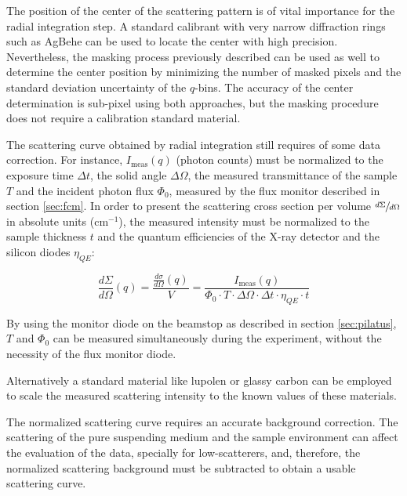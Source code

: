 The position of the center of the scattering pattern is of vital importance for the radial integration step. A standard calibrant with very narrow diffraction rings such as AgBehe can be used to locate the center with high precision. Nevertheless, the masking process previously described can be used as well to determine the center position by minimizing the number of masked pixels and the standard deviation uncertainty of the $q$-bins. The accuracy of the center determination is sub-pixel using both approaches, but the masking procedure does not require a calibration standard material.

The scattering curve obtained by radial integration still requires of some data correction. For instance, $I_{\text{meas}}(q)$ (photon counts) must be normalized to the exposure time $\Delta t$, the solid angle $\Delta \Omega$, the measured transmittance of the sample $T$ and the incident photon flux $\Phi_0$, measured by the flux monitor described in section \ref{sec:fcm}. In order to present the scattering cross section per volume $\sfrac{d\Sigma}{d\Omega}$ in absolute units (cm$^{-1}$), the measured intensity must be normalized to the sample thickness $t$ and the quantum efficiencies of the X-ray detector and the silicon diodes $\eta_{QE}$: 

\begin{equation}
\frac{d\Sigma}{d\Omega} \left(q\right)=\frac{\frac{d\sigma}{d\Omega}\left(q\right)}{V} =\frac{I_{\text{meas}}\left(q\right)}{\Phi_0 \cdot T \cdot \Delta\Omega \cdot \Delta t \cdot \eta_{QE} \cdot t}
\end{equation}

By using the monitor diode on the beamstop as described in section \ref{sec:pilatus}, $T$ and $\Phi_0$ can be measured simultaneously during the experiment, without the necessity of the flux monitor diode.

Alternatively a standard material like lupolen \citep{kratky_absolute_1966,shaffer_calibration_1974} or glassy carbon \citep{perret_glassy_1972} can be employed to scale the measured scattering intensity to the known values of these materials.

The normalized scattering curve requires an accurate background correction. The scattering of the pure suspending medium and the sample environment can affect the evaluation of the data, specially for low-scatterers, and, therefore, the normalized scattering background must be subtracted to obtain a usable scattering curve.

